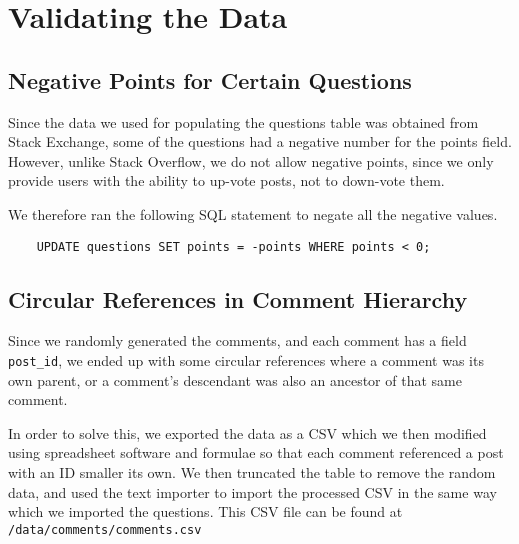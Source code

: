 \section{Validating the Data}

\subsection{Negative Points for Certain Questions}

Since the data we used for populating the questions table was obtained from Stack Exchange, some of the questions had a negative number for the points field. However, unlike Stack Overflow, we do not allow negative points, since we only provide users with the ability to up-vote posts, not to down-vote them.

We therefore ran the following SQL statement to negate all the negative values.

\begin{verbatim}
	UPDATE questions SET points = -points WHERE points < 0;
\end{verbatim}

\subsection{Circular References in Comment Hierarchy}

Since we randomly generated the comments, and each comment has a field \verb`post_id`, we ended up with some circular references where a comment was its own parent, or a comment's descendant was also an ancestor of that same comment.

In order to solve this, we exported the data as a CSV which we then modified using spreadsheet software and formulae so that each comment referenced a post with an ID smaller its own. We then truncated the table to remove the random data, and used the text importer to import the processed CSV in the same way which we imported the questions. This CSV file can be found at \verb`/data/comments/comments.csv`